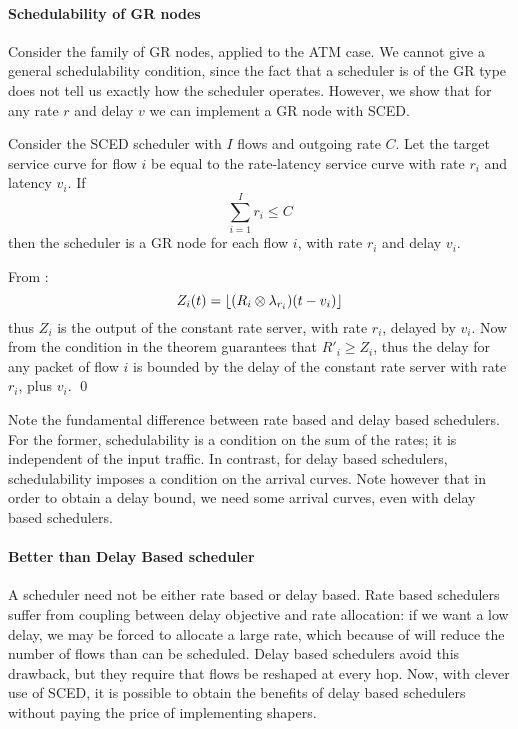 \paragraph{Schedulability of GR nodes}
Consider the family of GR nodes, applied to the ATM case. We
cannot give a general schedulability condition, since the fact
that a scheduler is of the GR type does not tell us exactly how
the scheduler operates. However, we show that for any rate $r$ and
delay $v$ we can implement a GR node with SCED.
\begin{theorem}
 Consider the SCED scheduler with $I$ flows and outgoing rate $C$.
 Let the target service curve for flow $i$ be
 equal to the rate-latency service curve with rate $r_i$ and
 latency $v_i$. If
 $$
 \sum_{i=1}^I r_i \leq C
 $$
 then the scheduler is a GR node for each flow $i$, with rate
$r_i$ and delay $v_i$.
\end{theorem}
\pr
From :
$$Z_i(t)=\lfloor (R_i \otimes\lambda_{r_i})(t-v_i) \rfloor$$
thus $Z_i$ is the output of the constant rate server, with rate
$r_i$, delayed by $v_i$. Now from  the
condition in the theorem guarantees that $R'_i \geq Z_i$, thus the
delay for any packet of flow $i$ is bounded by the delay of the
constant rate server with rate $r_i$, plus $v_i$. \qed

Note the fundamental difference between rate based and delay based
schedulers. For the former, schedulability is a condition on the
sum of the rates; it is independent of the input traffic. In
contrast, for delay based schedulers, schedulability imposes a
condition on the arrival curves. Note however that in order to
obtain a delay bound, we need some arrival curves, even with delay
based schedulers.

\paragraph{Better than Delay Based scheduler}
A scheduler need not be either rate based or delay based. Rate
based schedulers suffer from coupling between delay objective and
rate allocation: if we want a low delay, we may be forced to
allocate a large rate, which because of 
will reduce the number of flows than can be scheduled. Delay based
schedulers avoid this drawback, but they require that flows be
reshaped at every hop. Now, with clever use of SCED, it is
possible to obtain the benefits of delay based schedulers without
paying the price of implementing shapers.

